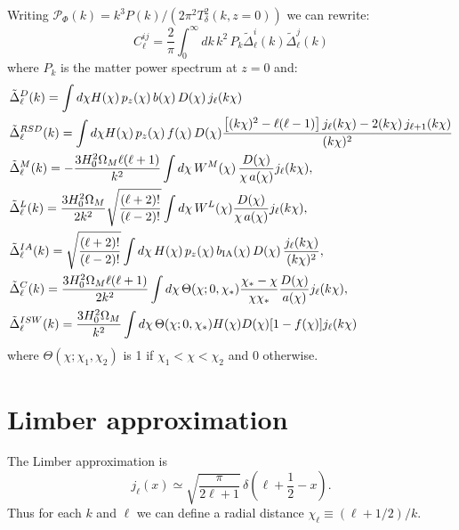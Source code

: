 \documentclass[a4paper,10pt]{article}
\begin{document}
Writing $\mathcal{P}_\Phi(k)=k^3P(k)/(2\pi^2T_\delta^2(k,z=0))$ we can rewrite:
\begin{equation}
  C_\ell^{ij}=\frac{2}{\pi}\int_0^\infty dk\,k^2\,P_k\tilde{\Delta}^i_\ell(k)\tilde{\Delta}^j_\ell(k)
\end{equation}
where $P_k$ is the matter power spectrum at $z=0$ and:
\begin{align}
  &\tilde{\Delta}_\ell^D(k)=\int d\chi H(\chi)\,p_z(\chi)\,b(\chi)\,D(\chi)\,j_\ell(k\chi)\\
  &\tilde{\Delta}_\ell^{RSD}(k)=\int d\chi H(\chi)\,p_z(\chi)\,f(\chi)\,D(\chi) \frac{\left[(k\chi)^2-\ell(\ell-1)\right]j_\ell(k\chi)-2(k\chi)\,j_{\ell+1}(k\chi)}{(k\chi)^2}\\
  &\tilde{\Delta}_\ell^M(k)=-\frac{3H_0^2\Omega_M\ell(\ell+1)}{k^2}\int d\chi\,W^M(\chi)\,\frac{D(\chi)}{\chi\,a(\chi)}j_\ell(k\chi), \\ 
  &\tilde{\Delta}_\ell^L(k)=\frac{3H_0^2\Omega_M}{2k^2}\sqrt{\frac{(\ell+2)!}{(\ell-2)!}}\int d\chi\,W^L(\chi)\frac{D(\chi)}{\chi\,a(\chi)}j_\ell(k\chi),  \\
  &\tilde{\Delta}_\ell^{IA}(k)=\sqrt{\frac{(\ell+2)!}{(\ell-2)!}}
                       \int d\chi\,H(\chi)\,p_z(\chi)\,b_{\rm IA}(\chi)\,D(\chi)\,\frac{j_\ell(k\chi)}{(k\chi)^2},  \\
  &\tilde{\Delta}_\ell^C(k)=\frac{3H_0^2\Omega_M\ell(\ell+1)}{2k^2}\int d\chi\,\Theta(\chi;0,\chi_*)
  \frac{\chi_*-\chi}{\chi\chi_*} \frac{D(\chi)}{a(\chi)} j_\ell(k\chi),  \\
  &\tilde{\Delta}_\ell^{ISW}(k)=\frac{3H_0^2\Omega_M}{k^2}\int d\chi\,\Theta(\chi;0,\chi_*)H(\chi)D(\chi)[1-f(\chi)]j_\ell(k\chi)
\end{align}
where $\Theta(\chi;\chi_1,\chi_2)$ is 1 if $\chi_1<\chi<\chi_2$ and 0 otherwise.

\section{Limber approximation}
The Limber approximation is
\begin{equation}
 j_\ell(x)\simeq\sqrt{\frac{\pi}{2\ell+1}}\,\delta\left(\ell+\frac{1}{2}-x\right).
\end{equation}
Thus for each $k$ and $\ell$ we can define a radial distance $\chi_\ell\equiv(\ell+1/2)/k$.
\end{document}
